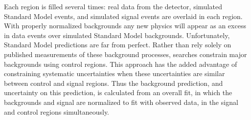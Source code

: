 Each region is filled several times: real data from the detector, simulated Standard Model events, and simulated signal events are overlaid in each region. With properly normalized backgrounds any new physics will appear as an excess in data events over simulated Standard Model backgrounds.
Unfortunately, Standard Model predictions are far from perfect. Rather than rely solely on published measurements of these background processes, searches constrain major backgrounds using control regions. This approach has the added advantage of constraining systematic uncertainties when these uncertainties are similar between control and signal regions. Thus the background prediction, and uncertainty on this prediction, is calculated from an overall fit, in which the backgrounds and signal are normalized to fit with observed data, in the signal and control regions simultaneously.

